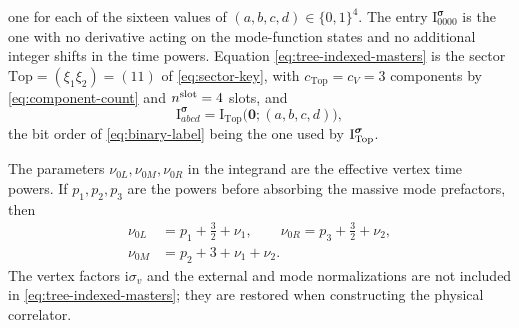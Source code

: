 \documentclass[11pt,a4paper]{article}
\newcommand{\ii}{\mathrm i}
\begin{document}
one for each of the sixteen values of $(a,b,c,d)\in\{0,1\}^4$.
The entry $\text{I}^{\boldsymbol\sigma}_{0000}$ is the one with no
derivative acting on the mode-function states and no additional
integer shifts in the time powers. Equation \eqref{eq:tree-indexed-masters} is the sector
$\mathrm{Top}=(\xi_1\xi_2)=(11)$ of \eqref{eq:sector-key}, with $c_{\mathrm{Top}}=c_V=3$ components
by \eqref{eq:component-count} and $n^{\rm slot}=4$ slots, and
\begin{equation}
 \text{I}^{\boldsymbol\sigma}_{abcd}
 =\text{I}_{\mathrm{Top}}\bigl(\bm 0;(a,b,c,d)\bigr),
 \label{eq:tree-top-identification}
\end{equation}
the bit order of \eqref{eq:binary-label} being the one used by $\bm{\text I}^{\boldsymbol\sigma}_{\mathrm{Top}}$.

The parameters $\nu_{0L},\nu_{0M},\nu_{0R}$ in the integrand are the
effective vertex time powers. If $p_1,p_2,p_3$ are the powers before
absorbing the massive mode prefactors, then
\begin{equation}
 \begin{aligned}
 \nu_{0L}&=p_1+\frac32+\nu_1,\qquad
 \nu_{0R}=p_3+\frac32+\nu_2,\\
 \nu_{0M}&=p_2+3+\nu_1+\nu_2.
 \end{aligned}
 \label{eq:tree-time-power-map}
\end{equation}
The vertex factors $\ii\sigma_v$ and the external and mode normalizations
are not included in \eqref{eq:tree-indexed-masters}; they are restored
when constructing the physical correlator.
\end{document}
